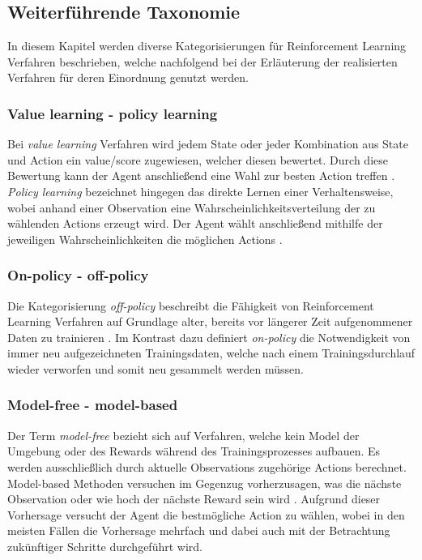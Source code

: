 \documentclass[11pt]{scrartcl}
\begin{document}
\subsection{Weiterführende Taxonomie}
In diesem Kapitel werden diverse Kategorisierungen für Reinforcement Learning Verfahren beschrieben,
welche nachfolgend bei der Erläuterung der realisierten Verfahren für deren Einordnung genutzt werden.


\subsubsection{Value learning - policy learning}
Bei \textit{value learning} Verfahren wird jedem State oder jeder Kombination aus State und Action ein
value/score zugewiesen, welcher diesen bewertet. Durch diese Bewertung kann der Agent anschließend eine
Wahl zur besten Action treffen \cite[~S.NA]{L2018}. \textit{Policy learning} bezeichnet hingegen das
direkte Lernen einer Verhaltensweise, wobei anhand einer Observation eine Wahrscheinlichkeitsverteilung
der zu wählenden Actions erzeugt wird. Der Agent wählt anschließend mithilfe der jeweiligen
Wahrscheinlichkeiten die möglichen Actions \cite[~S.78 f.]{L2018}.


\subsubsection{On-policy - off-policy}
Die Kategorisierung \textit{off-policy} beschreibt die Fähigkeit von Reinforcement Learning Verfahren auf
Grundlage alter, bereits vor längerer Zeit aufgenommener Daten zu trainieren \cite[~S.78 f.]{L2018}.
Im Kontrast dazu definiert \textit{on-policy} die Notwendigkeit von immer neu aufgezeichneten 
Trainingsdaten, welche nach einem Trainingsdurchlauf wieder verworfen und somit neu gesammelt
werden müssen.

\newpage
\subsubsection{Model-free - model-based}
Der Term \textit{model-free} bezieht sich auf Verfahren, welche kein Model der Umgebung oder des Rewards
während des Trainingsprozesses aufbauen. Es werden ausschließlich durch aktuelle Observations
zugehörige Actions berechnet. Model-based Methoden versuchen im Gegenzug vorherzusagen, was 
die nächste Observation oder wie hoch der nächste Reward sein wird \cite[~S.78 f.]{L2018}. Aufgrund dieser
Vorhersage versucht der Agent die bestmögliche Action zu wählen, wobei in den meisten
Fällen die Vorhersage mehrfach und dabei auch mit der Betrachtung zukünftiger Schritte durchgeführt
wird.
\end{document}
